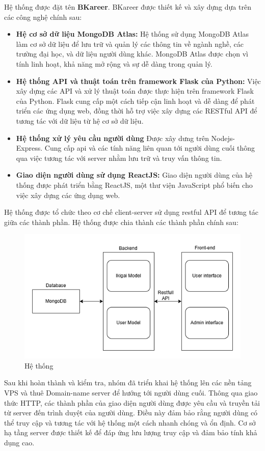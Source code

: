 Hệ thống được đặt tên \textbf{BKareer}.
BKareer được thiết kế và xây dựng dựa trên các công nghệ chính sau:
\begin{itemize}
    \item \textbf{Hệ cơ sở dữ liệu MongoDB Atlas:} Hệ thống sử dụng MongoDB Atlas làm cơ sở dữ liệu để lưu trữ và quản lý các thông tin về ngành nghề, các trường đại học, và dữ liệu người dùng khác. MongoDB Atlas được chọn vì tính linh hoạt, khả năng mở rộng và sự dễ dàng trong quản lý.
    \item \textbf{Hệ thống API và thuật toán trên framework Flask của Python:} Việc xây dựng các API và xử lý thuật toán được thực hiện trên framework Flask của Python. Flask cung cấp một cách tiếp cận linh hoạt và dễ dàng để phát triển các ứng dụng web, đồng thời hỗ trợ việc xây dựng các RESTful API để tương tác với dữ liệu từ hệ cơ sở dữ liệu.
    \item \textbf{Hệ thống xử lý yêu cầu người dùng} Được xây dưng trên Nodejs-Express. Cung cấp api và các tính năng liên quan tới người dùng cuối thông qua việc tương tác với server nhằm lưu trữ và truy vấn thông tin. 
    \item \textbf{Giao diện người dùng sử dụng ReactJS:} Giao diện người dùng của hệ thống được phát triển bằng ReactJS, một thư viện JavaScript phổ biến cho việc xây dựng các ứng dụng web.
\end{itemize}

Hệ thống được tổ chức theo cơ chế client-server sử dụng restful API để tương tác giữa các thành phần. Hệ thống được chia thành các thành phần chính sau:
\begin{figure}[H]
    \centering
    \includegraphics[width=0.7\linewidth]{images/sys.png}
    \vspace{0.5cm}
    \caption{Hệ thống}
\end{figure}

Sau khi hoàn thành và kiểm tra, nhóm đã triển khai hệ thống lên các nền tảng VPS và thuê Domain-name server để hướng tới người dùng cuối. Thông qua giao thức HTTP, các thành phần của giao diện người dùng được yêu cầu và truyền tải từ server đến trình duyệt của người dùng. Điều này đảm bảo rằng người dùng có thể truy cập và tương tác với hệ thống một cách nhanh chóng và ổn định. Cơ sở hạ tầng server được thiết kế để đáp ứng lưu lượng truy cập và đảm bảo tính khả dụng cao.

